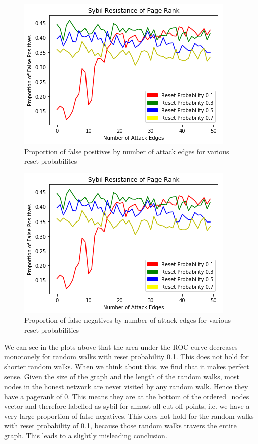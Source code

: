 \documentclass[twocolumn]{article}
\theoremstyle{definition}
\theoremstyle{theorem}
\begin{document}
\begin{figure}
\includegraphics[scale=0.6]{ROCArea2}
\caption{Proportion of false positives by number of attack edges for various reset probabilites}
\label{fig:ROCArea2}
\end{figure}

\begin{figure}
\includegraphics[scale=0.6]{ROCArea2}
\caption{Proportion of false negatives by number of attack edges for various reset probabilities}
\label{fig:ROCArea3}
\end{figure}

\noindent We can see in the plots above that the area under the ROC curve decreases monotonely for random walks with reset probability 0.1. This does not hold for shorter random walks. When we think about this, we find that it makes perfect sense. Given the size of the graph and the length of the random walks, most nodes in the honest network are never visited by any random walk. Hence they have a pagerank of 0. This means they are at the bottom of the ordered\_{}nodes vector and therefore labelled as sybil for almost all cut-off points, i.e. we have a very large proportion of false negatives. This does not hold for the random walks with reset probability of 0.1, because those random walks travers the entire graph. This leads to a slightly misleading conclusion. \vspace{1em}\\
\end{document}
